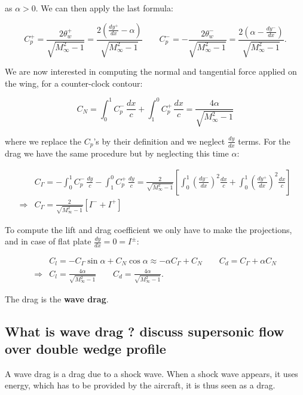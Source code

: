 \documentclass[british,french,11pt, a4paper, openany]{article}
\begin{document}
as $\alpha > 0$. We can then apply the last formula: 

\begin{equation}
C_p^+ = \frac{2\theta_w^+}{\sqrt{M^2_\infty - 1}} = \frac{2\left( \frac{dy^+}{dx} -\alpha \right)}{\sqrt{M^2_\infty - 1}} \qquad C_p^- = -\frac{2\theta_w^-}{\sqrt{M^2_\infty - 1}} = \frac{2\left( \alpha -\frac{dy^-}{dx}\right)}{\sqrt{M^2_\infty - 1}}.
\end{equation}

We are now interested in computing the normal and tangential force applied on the wing, for a counter-clock contour: 

\begin{equation}
C_N = \int _0 ^1 C_p ^- \, \frac{dx}{c} + \int _1 ^0 C_p ^+ \, \frac{dx}{c} = \frac{4\alpha }{\sqrt{M_\infty ^2-1}}
\end{equation}

where we replace the $C_p$'s by their definition and we neglect $\frac{dy}{dx}$ terms. For the drag we have the same procedure but by neglecting this time $\alpha$:

\begin{equation}
\begin{aligned}
&C_\Gamma = -\int _0 ^1 C_p ^- \, \frac{dy}{c} - \int _1 ^0 C_p ^+ \, \frac{dy}{c} = \frac{2}{\sqrt{M_\infty ^2-1}} \left[ \int _0^1 \left(\frac{dy^-}{dx} \right)^2 \frac{dx}{c} + \int _0^1 \left(\frac{dy^+}{dx} \right)^2 \frac{dx}{c} \right]\\
\Rightarrow &C_\Gamma =  \frac{2}{\sqrt{M_\infty ^2-1}} [I^- + I^+]
\end{aligned}
\end{equation}

To compute the lift and drag coefficient we only have to make the projections, and in case of flat plate $\frac{dy}{dx} = 0 = I^\pm$: 

\begin{equation}
\begin{aligned}
&C_l = -C_\Gamma \sin \alpha + C_N \cos \alpha \approx -\alpha C_\Gamma  + C_N \qquad C_d = C_\Gamma  + \alpha C_N\\
\Rightarrow &C_l = \frac{4\alpha}{\sqrt{M_\infty ^2 -1}} \qquad C_d = \frac{4\alpha}{\sqrt{M_\infty ^2 -1}}.
\end{aligned}
\end{equation}

The drag is the \textbf{wave drag}.

\subsection{What is wave drag ? discuss supersonic flow over double wedge profile}
A wave drag is a drag due to a shock wave. When a shock wave appears, it uses energy, which has to be provided by the aircraft, it is thus seen as a drag.
\end{document}
